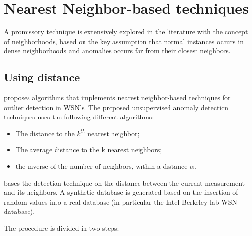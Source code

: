 \newpage

\section{Nearest Neighbor-based techniques}

\label{sec:nnbased}



A promissory technique is extensively explored in the literature with the concept of neighborhoods, based on the key assumption that normal instances occurs in dense neighborhoods and anomalies occurs far from their closest neighbors.





\subsection{Using distance}



\cite{class:branch:2006} proposes algorithms that implements nearest neighbor-based techniques for outlier detection in WSN's. The proposed unsupervised anomaly detection techniques uses the following different algorithms:



\begin{itemize}

	\setlength\itemsep{-0.5em}

	\item The distance to the $k^{th}$ nearest neighbor;

	\item The average distance to the k nearest neighbors;

	\item the inverse of the number of neighbors, within a distance $\alpha$.	

\end{itemize}



\cite{nn:abid:2016} bases the detection technique on the distance between the current measurement and its neighbors. A synthetic database is generated based on the insertion of random values into a real database (in particular the Intel Berkeley lab WSN database).

The procedure is divided in two steps: 

